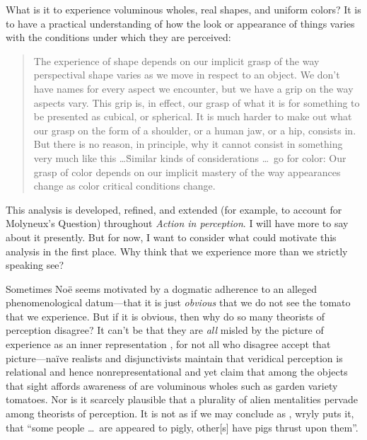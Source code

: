\documentclass[12pt]{article}
\begin{document}

What is it to experience voluminous wholes, real shapes, and uniform colors? It is to have a practical understanding of how the look or appearance of things varies with the conditions under which they are perceived:
\begin{quote}
	The experience of shape depends on our implicit grasp of the way perspectival shape varies as we move in respect to an object. We don’t have names for every aspect we encounter, but we have a grip on the way aspects vary. This grip is, in effect, our grasp of what it is for something to be presented as cubical, or spherical. It is much harder to make out what our grasp on the form of a shoulder, or a human jaw, or a hip, consists in. But there is no reason, in principle, why it cannot consist in something very much like this \ldots\. Similar kinds of considerations \ldots\ go for color: Our grasp of color depends on our implicit mastery of the way appearances change as color critical conditions change. \citep[198--199]{Noe:2004fk}
\end{quote}
This analysis is developed, refined, and extended (for example, to account for Molyneux's Question) throughout \emph{Action in perception}. I will have more to say about it presently. But for now, I want to consider what could motivate this analysis in the first place. Why think that we experience more than we strictly speaking see?

Sometimes Noë seems motivated by a dogmatic adherence to an alleged phenomenological datum---that it is just \emph{obvious} that we do not see the tomato that we experience. But if it is obvious, then why do so many theorists of perception disagree? It can't be that they are \emph{all} misled by the picture of experience as an inner representation \citep[chapter 2]{Noe:2004fk}, for not all who disagree accept that picture---naïve realists and disjunctivists maintain that veridical perception is relational and hence nonrepresentational and yet claim that among the objects that sight affords awareness of are voluminous wholes such as garden variety tomatoes. Nor is it scarcely plausible that a plurality of alien mentalities pervade among theorists of perception. It is not as if we may conclude as \citet[69]{Sartwell:1995ve}, wryly puts it, that ``some people \ldots\ are appeared to pigly, other[s] have pigs thrust upon them''. 
\end{document}
